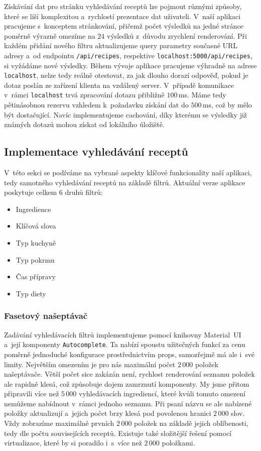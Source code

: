 Získávání dat pro stránku vyhledávání receptů lze pojmout různými způsoby, které se liší komplexitou a~rychlostí prezentace dat uživateli. V~naší aplikaci pracujeme s~konceptem stránkování, přičemž počet výsledků na jedné stránce poměrně výrazně omezíme na $24$ výsledků z~důvodu zrychlení renderování. Při každém přidání nového filtru aktualizujeme query parametry současné URL adresy a~od endpointu \texttt{/api/recipes}, respektive \texttt{localhost:5000/api/recipes}, si vyžádáme nové výsledky. Během vývoje aplikace pracujeme výhradně na adrese \texttt{localhost}, nelze tedy reálně otestovat, za jak dlouho dorazí odpověď, pokud je dotaz poslán ze zařízení klienta na vzdálený server. V~případě komunikace v~rámci \texttt{localhost} trvá zpracování dotazu přibližně $100\,$ms. Máme tedy pětinásobnou rezervu vzhledem k~požadavku získání dat do $500\,$ms, což by mělo být dostačující. Navíc implementujeme cachování, díky kterému se výsledky již známých dotazů mohou získat od lokálního úložiště.

\subsection{Implementace vyhledávání receptů}

V~této sekci se podíváme na vybrané aspekty klíčové funkcionality naší aplikaci, tedy samotného vyhledávání receptů na základě filtrů. Aktuální verze aplikace poskytuje celkem $6$ druhů filtrů:

\begin{itemize}
    \item Ingredience
    \item Klíčová slova
    \item Typ kuchyně
    \item Typ pokrmu
    \item Čas přípravy
    \item Typ diety
\end{itemize}

\subsubsection{Fasetový našeptávač}

Zadávání vyhledávacích filtrů implementujeme pomocí knihovny Material~UI a~její komponenty \texttt{Autocomplete}. Ta nabízí spoustu užitečných funkcí za cenu poměrně jednoduché konfigurace prostřednictvím props, samozřejmě má ale i~své limity. Největším omezením je pro nás maximální počet $2\,000$ položek našeptávače. Větší počet sice zakázán není, rychlost renderování seznamu položek ale rapidně klesá, což způsobuje dojem zamrznutí komponenty. My jsme přitom připravili více než $5\,000$ vyhledávacích ingrediencí, které kvůli tomuto omezení nemůžeme nabídnout v~rámci jednoho seznamu. Při psaní názvu se ale nabízené položky aktualizují a~jejich počet brzy klesá pod povolenou hranici $2\,000$ slov. Vždy zobrazíme maximálně prvních $2\,000$ položek na základě jejich oblíbenosti, tedy dle počtu souvisejících receptů. Existuje také složitější řešení pomocí virtualizace, které by si poradilo i~s~více než $2\,000$ položkami.

